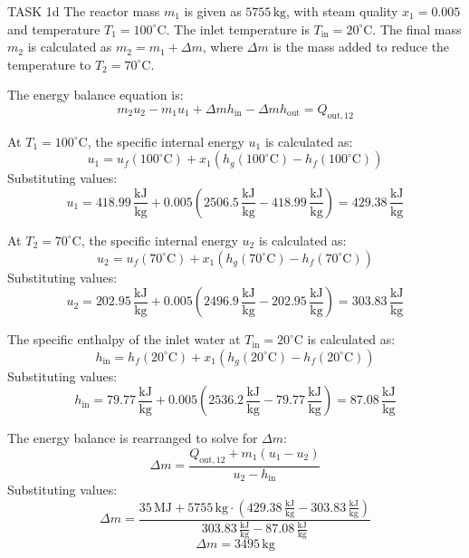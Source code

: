 TASK 1d  
The reactor mass \( m_1 \) is given as \( 5755 \, \text{kg} \), with steam quality \( x_1 = 0.005 \) and temperature \( T_1 = 100^\circ\text{C} \). The inlet temperature is \( T_{\text{in}} = 20^\circ\text{C} \). The final mass \( m_2 \) is calculated as \( m_2 = m_1 + \Delta m \), where \( \Delta m \) is the mass added to reduce the temperature to \( T_2 = 70^\circ\text{C} \).

The energy balance equation is:  
\[
m_2 u_2 - m_1 u_1 + \Delta m h_{\text{in}} - \Delta m h_{\text{out}} = Q_{\text{out},12}
\]

At \( T_1 = 100^\circ\text{C} \), the specific internal energy \( u_1 \) is calculated as:  
\[
u_1 = u_f(100^\circ\text{C}) + x_1 \left( h_g(100^\circ\text{C}) - h_f(100^\circ\text{C}) \right)
\]  
Substituting values:  
\[
u_1 = 418.99 \, \frac{\text{kJ}}{\text{kg}} + 0.005 \left( 2506.5 \, \frac{\text{kJ}}{\text{kg}} - 418.99 \, \frac{\text{kJ}}{\text{kg}} \right) = 429.38 \, \frac{\text{kJ}}{\text{kg}}
\]

At \( T_2 = 70^\circ\text{C} \), the specific internal energy \( u_2 \) is calculated as:  
\[
u_2 = u_f(70^\circ\text{C}) + x_1 \left( h_g(70^\circ\text{C}) - h_f(70^\circ\text{C}) \right)
\]  
Substituting values:  
\[
u_2 = 202.95 \, \frac{\text{kJ}}{\text{kg}} + 0.005 \left( 2496.9 \, \frac{\text{kJ}}{\text{kg}} - 202.95 \, \frac{\text{kJ}}{\text{kg}} \right) = 303.83 \, \frac{\text{kJ}}{\text{kg}}
\]

The specific enthalpy of the inlet water at \( T_{\text{in}} = 20^\circ\text{C} \) is calculated as:  
\[
h_{\text{in}} = h_f(20^\circ\text{C}) + x_1 \left( h_g(20^\circ\text{C}) - h_f(20^\circ\text{C}) \right)
\]  
Substituting values:  
\[
h_{\text{in}} = 79.77 \, \frac{\text{kJ}}{\text{kg}} + 0.005 \left( 2536.2 \, \frac{\text{kJ}}{\text{kg}} - 79.77 \, \frac{\text{kJ}}{\text{kg}} \right) = 87.08 \, \frac{\text{kJ}}{\text{kg}}
\]

The energy balance is rearranged to solve for \( \Delta m \):  
\[
\Delta m = \frac{Q_{\text{out},12} + m_1 (u_1 - u_2)}{u_2 - h_{\text{in}}}
\]  
Substituting values:  
\[
\Delta m = \frac{35 \, \text{MJ} + 5755 \, \text{kg} \cdot (429.38 \, \frac{\text{kJ}}{\text{kg}} - 303.83 \, \frac{\text{kJ}}{\text{kg}})}{303.83 \, \frac{\text{kJ}}{\text{kg}} - 87.08 \, \frac{\text{kJ}}{\text{kg}}}
\]  
\[
\Delta m = 3495 \, \text{kg}
\]